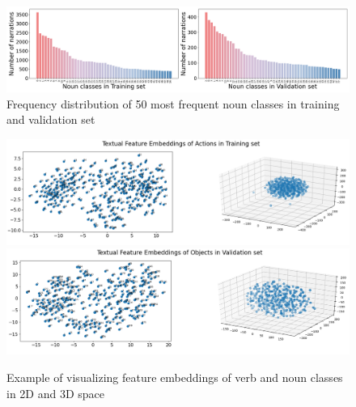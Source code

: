 \begin{figure}[hp]
    \begin{minipage}{1\textwidth}
    \centering
    \includegraphics[scale=0.3]{figures/noun_count.png}
    \caption{Frequency distribution of 50 most frequent noun classes in training and validation set}
    \label{fig:noun-freq}
    \end{minipage}
\end{figure}
\begin{figure}[htp!]
    \begin{minipage}{1\textwidth}
        \begin{center}
            \includegraphics[scale=0.36]{figures/Actions_embeddings_Training.png}
            \\
            \vspace{5mm}
            \includegraphics[scale=0.36]{figures/Objects_embeddings_Validation.png}
            \caption{Example of visualizing feature embeddings of verb and noun classes in 2D and 3D space}
            \label{fig:embedding}
        \end{center}
    \end{minipage}
\end{figure}
\clearpage

